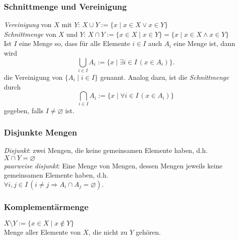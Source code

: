 \subsubsection{Schnittmenge und Vereinigung}%
\label{ssub:schnittmenge_und_vereinigung}
\begin{minipage}{0.9\linewidth}
	\textit{Vereinigung} von $X$ mit $Y$: $X\cup Y:=\{x\mid x\in X\lor x\in Y \} $ \\
	\textit{Schnittmenge} von $X$ und $Y$: $X\cap Y:=\{x\in X\mid x\in Y \}=\{x\mid x\in X\land x\in Y\}$ \\
	Ist $I$ eine Menge so, dass für alle Elemente $i\in I$ auch $A_i$ eine Menge ist, dann wird
	\[
		\bigcup_{i\in I}A_i:=\{x\mid\exists i\in I\,(x\in A_i) \}.
	\]
	die Vereinigung von $\{A_i\mid i\in I\}$ genannt.
	Analog dazu, ist die \textit{Schnittmenge} durch
	\[
		\bigcap_{i\in I}A_i:=\{x\mid\forall i\in I\,(x\in A_i) \}
	\]
	gegeben, falls $I\neq\varnothing$ ist.
\end{minipage}

\subsubsection{Disjunkte Mengen}%
\label{ssub:disjunkte_mengen}
\begin{minipage}{0.9\linewidth}
	\textit{Disjunkt}: zwei Mengen, die keine gemeinsamen Elemente haben, d.h. \\
	$X\cap Y=\varnothing$ \\
	\textit{paarweise disjunkt}: Eine Menge von Mengen, dessen Mengen jeweils keine gemeinsamen Elemente haben, d.h. \\
	$\forall i,j\in I\,(i\neq j\Rightarrow A_i\cap A_j=\varnothing).$
\end{minipage}

\subsubsection{Komplementärmenge}%
\label{ssub:komplementärmenge}
\begin{minipage}{0.9\linewidth}
	$X\setminus Y:=\{x\in X\mid x\notin Y\}$ \\
	Menge aller Elemente von $X$, die nicht zu $Y$ gehören.
\end{minipage}

